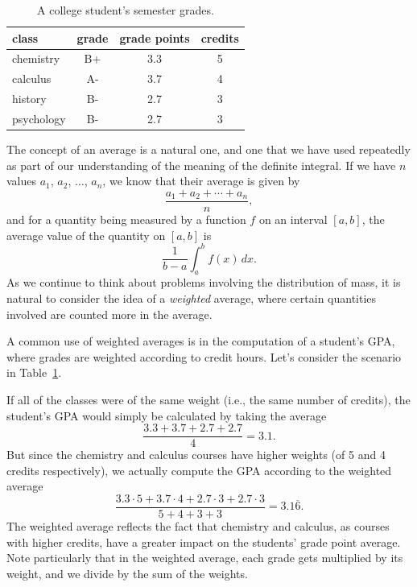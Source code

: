 \begin{table}[h]
\begin{center}
\begin{tabular}{ | l || c | c | c |}
   \hline 
   class & grade & grade points & credits  \\
   \hline \hline
   chemistry & B+ & 3.3 & 5 \\
   \hline
   calculus & A- & 3.7 & 4 \\
   \hline
   history & B- & 2.7 & 3 \\
   \hline
   psychology & B- & 2.7 & 3 \\
   \hline
\end{tabular} 
\end{center}
\caption{A college student's semester grades.} \label{T:6.3.grades}
\end{table}


The concept of an average is a natural one, and one that we have used repeatedly as part of our understanding of the meaning of the definite integral.  If we have $n$ values $a_1$, $a_2$, $\ldots$, $a_n$, we know that their average is given by
$$\frac{a_1 + a_2 + \cdots + a_n}{n},$$
and for a quantity being measured by a function $f$ on an interval $[a,b]$, the average value of the quantity on $[a,b]$ is
$$\frac{1}{b-a} \int_a^b f(x) \, dx.$$
As we continue to think about problems involving the distribution of mass, it is natural to consider the idea of a \emph{weighted} average,  where certain quantities involved are counted more in the average.

A common use of weighted averages is in the computation of a student's GPA, where grades are weighted according to credit hours.  Let's consider the scenario in Table~\ref{T:6.3.grades}.

If all of the classes were of the same weight (i.e., the same number of credits), the student's GPA would simply be calculated by taking the average
$$\frac{3.3 + 3.7 + 2.7 + 2.7}{4} = 3.1.$$
But since the chemistry and calculus courses have higher weights (of 5 and 4 credits respectively), we actually compute the GPA according to the weighted average 
$$\frac{3.3 \cdot 5 + 3.7 \cdot 4 + 2.7 \cdot 3 + 2.7 \cdot 3}{5 + 4 + 3 + 3} = 3.1\overline{6}.$$
The weighted average reflects the fact that chemistry and calculus, as courses with higher credits, have a greater impact on the students' grade point average.  Note particularly that in the weighted average, each grade gets multiplied by its weight, and we divide by the sum of the weights.

